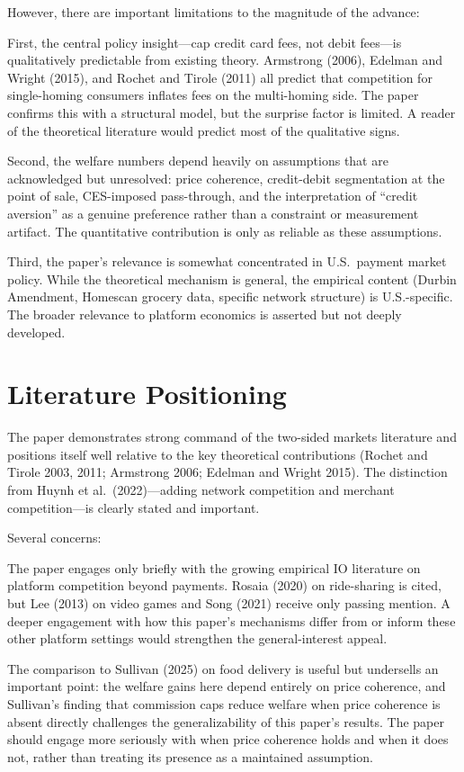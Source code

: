 \documentclass[11pt]{article}
\begin{document}
However, there are important limitations to the magnitude of the advance:

First, the central policy insight---cap credit card fees, not debit fees---is qualitatively predictable from existing theory. Armstrong (2006), Edelman and Wright (2015), and Rochet and Tirole (2011) all predict that competition for single-homing consumers inflates fees on the multi-homing side. The paper confirms this with a structural model, but the surprise factor is limited. A reader of the theoretical literature would predict most of the qualitative signs.

Second, the welfare numbers depend heavily on assumptions that are acknowledged but unresolved: price coherence, credit-debit segmentation at the point of sale, CES-imposed pass-through, and the interpretation of ``credit aversion'' as a genuine preference rather than a constraint or measurement artifact. The quantitative contribution is only as reliable as these assumptions.

Third, the paper's relevance is somewhat concentrated in U.S.\ payment market policy. While the theoretical mechanism is general, the empirical content (Durbin Amendment, Homescan grocery data, specific network structure) is U.S.-specific. The broader relevance to platform economics is asserted but not deeply developed.

\section{Literature Positioning}

The paper demonstrates strong command of the two-sided markets literature and positions itself well relative to the key theoretical contributions (Rochet and Tirole 2003, 2011; Armstrong 2006; Edelman and Wright 2015). The distinction from Huynh et al.\ (2022)---adding network competition and merchant competition---is clearly stated and important.

Several concerns:

The paper engages only briefly with the growing empirical IO literature on platform competition beyond payments. Rosaia (2020) on ride-sharing is cited, but Lee (2013) on video games and Song (2021) receive only passing mention. A deeper engagement with how this paper's mechanisms differ from or inform these other platform settings would strengthen the general-interest appeal.

The comparison to Sullivan (2025) on food delivery is useful but undersells an important point: the welfare gains here depend entirely on price coherence, and Sullivan's finding that commission caps reduce welfare when price coherence is absent directly challenges the generalizability of this paper's results. The paper should engage more seriously with when price coherence holds and when it does not, rather than treating its presence as a maintained assumption.
\end{document}
